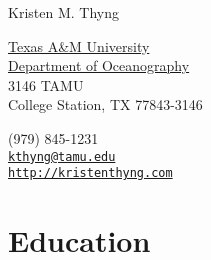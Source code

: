 \documentclass[10pt,letterpaper]{article}
\def\name{Kristen M. Thyng}
\begin{document}


{\huge \name}


\vspace{0.25in}

\begin{minipage}[t]{0.5\textwidth}
  \href{http://www.tamu.edu/}{Texas A\&M University} \\
  \href{http://ocean.tamu.edu/}{Department of Oceanography} \\
  3146 TAMU \\
  College Station, TX 77843-3146 \\
\end{minipage}
\begin{minipage}[t]{0.5\textwidth}
  (979) 845-1231 \\
  \href{mailto:kthyng@tamu.edu}{\tt kthyng@tamu.edu} \\
  \href{http://kristenthyng.com}{\tt http://kristenthyng.com} \\
\end{minipage}

\section*{Education}
\end{document}
